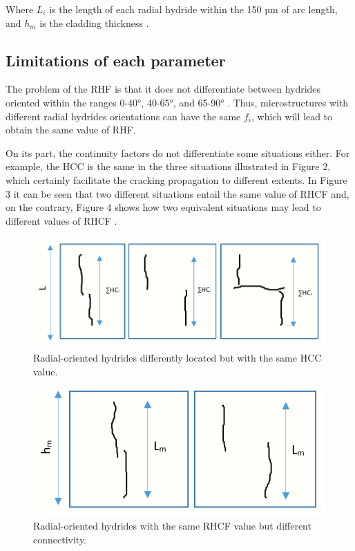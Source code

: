\documentclass[12pt]{article}
\begin{document}
\vspace{150}
\noindent
Where $L_i$ is the length of each radial hydride within the 150 µm of arc length, and $h_m$ is the cladding thickness \cite{SIMON2021152817}.

\subsection{Limitations of each parameter}

\noindent
The problem of the RHF is that it does not differentiate between hydrides oriented within the ranges 0-40°, 40-65°, and 65-90° \cite{SIMON2021152817}. Thus, microstructures with different radial hydrides orientations can have the same $f_i$, which will lead to obtain the same value of RHF.

\noindent
On its part, the continuity factors do not differentiate some situations either. For example, the HCC is the same in the three situations illustrated in Figure 2, which certainly facilitate the cracking propagation to different extents. In Figure 3 it can be seen that two different situations entail the same value of RHCF and, on the contrary, Figure 4 shows how two equivalent situations may lead to different values of RHCF \cite{SIMON2021152817}.

\begin{figure}[h] %
    \centering
    \includegraphics[width=4.5in]{HCC comparison.png}
    \caption{Radial-oriented hydrides differently located but with the same HCC value.}
    \label{fig:my_label}
\end{figure}

\begin{figure}[h] %
    \centering
    \includegraphics[width=4.5in]{RHCF comparison 1.png}
    \caption{Radial-oriented hydrides with the same RHCF value but different connectivity.}
    \label{fig:my_label}
\end{figure}
\end{document}
